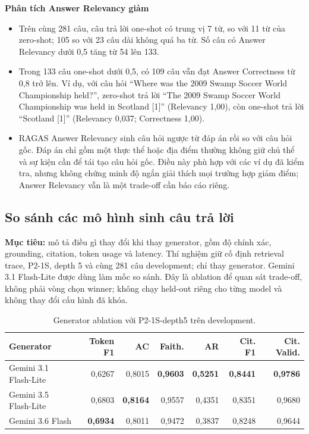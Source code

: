 \noindent\textbf{Phân tích Answer Relevancy giảm}
\begin{itemize}
  \item Trên cùng 281 câu, câu trả lời one-shot có trung vị 7 từ, so với 11 từ
  của zero-shot; 105 so với 23 câu dài không quá ba từ. Số câu có Answer
  Relevancy dưới 0,5 tăng từ 54 lên 133.
  \item Trong 133 câu one-shot dưới 0,5, có 109 câu vẫn đạt Answer Correctness
  từ 0,8 trở lên. Ví dụ, với câu hỏi ``Where was the 2009 Swamp Soccer World
  Championship held?'', zero-shot trả lời ``The 2009 Swamp Soccer World
  Championship was held in Scotland [1]'' (Relevancy 1,00), còn one-shot trả
  lời ``Scotland [1]'' (Relevancy 0,037; Correctness 1,00).
  \item RAGAS Answer Relevancy sinh câu hỏi ngược từ đáp án rồi so với câu hỏi
  gốc. Đáp án chỉ gồm một thực thể hoặc địa điểm thường không giữ chủ thể và
  sự kiện cần để tái tạo câu hỏi gốc. Điều này phù hợp với các ví dụ đã kiểm
  tra, nhưng không chứng minh độ ngắn giải thích mọi trường hợp giảm điểm;
  Answer Relevancy vẫn là một trade-off cần báo cáo riêng.
\end{itemize}

\subsection{So sánh các mô hình sinh câu trả lời}

\textbf{Mục tiêu:} mô tả điều gì thay đổi khi thay generator, gồm độ chính xác,
grounding, citation, token usage và latency. Thí nghiệm giữ cố định retrieval
trace, P2-1S, depth 5 và cùng 281 câu development; chỉ thay generator. Gemini
3.1 Flash-Lite được dùng làm mốc so sánh. Đây là ablation để quan sát trade-off,
không phải vòng chọn winner; không chạy held-out riêng cho từng model và không
thay đổi cấu hình đã khóa.

\begin{table}[H]
  \centering
  \caption{Generator ablation với P2-1S-depth5 trên development.}
  \label{tab:phase2-generator-ablation}
  \small
  \begin{tabular}{lrrrrrr}
    \toprule
    \textbf{Generator} & \textbf{Token F1} & \textbf{AC} & \textbf{Faith.} &
    \textbf{AR} & \textbf{Cit. F1} & \textbf{Cit. Valid.} \\
    \midrule
    Gemini 3.1 Flash-Lite & 0,6267 & 0,8015 & \textbf{0,9603} & \textbf{0,5251} & \textbf{0,8441} & \textbf{0,9786} \\
    Gemini 3.5 Flash-Lite & 0,6803 & \textbf{0,8164} & 0,9557 & 0,4351 & 0,8351 & 0,9680 \\
    Gemini 3.6 Flash & \textbf{0,6934} & 0,8011 & 0,9472 & 0,3837 & 0,8248 & 0,9644 \\
    \bottomrule
  \end{tabular}
\end{table}

